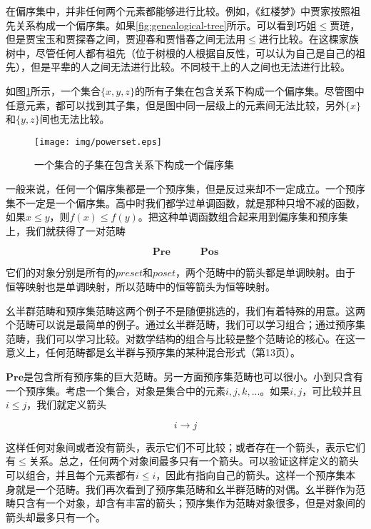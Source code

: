 \documentclass{article}
\begin{document}
在偏序集中，并非任何两个元素都能够进行比较。例如，《红楼梦》中贾家按照祖先关系构成一个偏序集。如果\ref{fig:genealogical-tree}所示。可以看到巧姐$\leq$贾琏，但是贾宝玉和贾探春之间，贾迎春和贾惜春之间无法用$\leq$进行比较。在这棵家族树中，尽管任何人都有祖先（位于树根的人根据自反性，可以认为自己是自己的祖先），但是平辈的人之间无法进行比较。不同枝干上的人之间也无法进行比较。

如图\ref{fig:powerset}所示，一个集合$\{x, y, z\}$的所有子集在包含关系下构成一个偏序集。尽管图中任意元素，都可以找到其子集，但是图中同一层级上的元素间无法比较，另外$\{x\}$和$\{y, z\}$间也无法比较。

\begin{figure}[htbp]
 \centering
 \texttt{[image: img/powerset.eps]}
 \caption{一个集合的子集在包含关系下构成一个偏序集}
 \label{fig:powerset}
\end{figure}

 
一般来说，任何一个偏序集都是一个预序集，但是反过来却不一定成立。一个预序集不一定是一个偏序集。高中时我们都学过单调函数，就是那种只增不减的函数，如果$x \leq y$，则$f(x) \leq f(y)$。把这种单调函数组合起来用到偏序集和预序集上，我们就获得了一对范畴

\[
\pmb{Pre} \quad \quad \quad \pmb{Pos}
\]

它们的对象分别是所有的$preset$和$poset$，两个范畴中的箭头都是单调映射。由于恒等映射也是单调映射，所以范畴中的恒等箭头为恒等映射。

幺半群范畴和预序集范畴这两个例子不是随便挑选的，我们有着特殊的用意。这两个范畴可以说是最简单的例子。通过幺半群范畴，我们可以学习组合；通过预序集范畴，我们可以学习比较。对数学结构的组合与比较是整个范畴论的核心。在这一意义上，任何范畴都是幺半群与预序集的某种混合形式（\cite{Simmons2011}第13页）。

$\pmb{Pre}$是包含所有预序集的巨大范畴。另一方面预序集范畴也可以很小。小到只含有一个预序集。考虑一个集合，对象是集合中的元素$i, j, k, ...$。如果$i, j$，可比较并且$i \leq j$，我们就定义箭头

\[
i \longrightarrow j
\]

这样任何对象间或者没有箭头，表示它们不可比较；或者存在一个箭头，表示它们有$\leq$关系。总之，任何两个对象间最多只有一个箭头。可以验证这样定义的箭头可以组合，并且每个元素都有$i \leq i$，因此有指向自己的箭头。这样一个预序集本身就是一个范畴。我们再次看到了预序集范畴和幺半群范畴的对偶。幺半群作为范畴只含有一个对象，却含有丰富的箭头；预序集作为范畴对象很多，但是对象间的箭头却最多只有一个。
\end{document}
